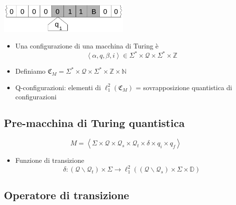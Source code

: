 \documentclass{beamer}
\newcommand{\conf}{\mathfrak{C}_{M}}
\newcommand{\hil}{\ell^{2}}
\newcommand{\hiluninorm}{\hil_{1}}
\begin{document}
\begin{frame}{\subsecname}{}
	\centering\includegraphics[width=6.5cm]{Turing_machine_2b.png}
	\begin{itemize}
		\item Una \alert{configurazione} di una macchina di Turing è
		\[ \left \langle \alpha, q, \beta, i \right \rangle \in \Sigma^{*} \times \mathcal{Q} \times \Sigma^{*} \times \mathbb{Z} \]
		\item Definiamo \( \conf = \Sigma^{*} \times \mathcal{Q} \times \Sigma^{*} \times \mathbb{Z} \times \mathbb{N} \)
		\item \alert{Q-configurazioni}: elementi di \( \hiluninorm \left ( \conf \right ) \) = sovrapposizione quantistica di configurazioni
	\end{itemize}
\end{frame}

\subsection{Pre-macchina di Turing quantistica}

\begin{frame}{\subsecname}{}
	\[ M = \left \langle \Sigma \times \mathcal{Q} \times \mathcal{Q}_{s} \times \mathcal{Q}_{t} \times \delta \times q_{i} \times q_{f} \right \rangle \]
	\begin{itemize}
		\item Funzione di transizione
		\[ \delta : \left ( \mathcal{Q} \backslash \mathcal{Q}_{t} \right ) \times \Sigma \rightarrow \hiluninorm \left ( \left ( \mathcal{Q} \backslash \mathcal{Q}_{s} \right ) \times \Sigma \times \mathbb{D} \right ) \]
	\end{itemize}
\end{frame}

\subsection{Operatore di transizione}
\end{document}
